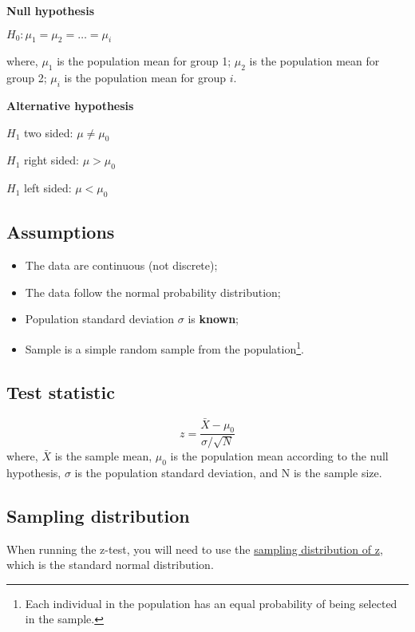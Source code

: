 \documentclass[
]{article}
\providecommand{\tightlist}{%
  \setlength{\itemsep}{0pt}\setlength{\parskip}{0pt}}
\begin{document}
\textbf{Null hypothesis}

\(H_0:\mu_1 = \mu_2 = \ldots = \mu_i\)

where, \(\mu_1\) is the population mean for group 1; \(\mu_2\) is the population mean for group 2; \(\mu_i\) is the population mean for group \(i\).

\textbf{Alternative hypothesis}

\(H_1\) two sided: \(\mu \ne \mu_0\)

\(H_1\) right sided: \(\mu > \mu_0\)

\(H_1\) left sided: \(\mu < \mu_0\)

\hypertarget{assumptions}{%
\subsection{Assumptions}\label{assumptions}}

\begin{itemize}
\tightlist
\item
  The data are continuous (not discrete);
\item
  The data follow the normal probability distribution;
\item
  Population standard deviation \(\sigma\) is \textbf{known};
\item
  Sample is a simple random sample from the population\footnote{Each individual in the population has an equal probability of being selected in the sample.}.
\end{itemize}

\hypertarget{test-statistic}{%
\subsection{Test statistic}\label{test-statistic}}

\[
z = \dfrac{\bar{X} - \mu_0}{\sigma / \sqrt{N}}
\] where, \(\bar{X}\) is the sample mean, \(\mu_0\) is the population mean according to the null hypothesis, \(\sigma\) is the population standard deviation, and N is the sample size.

\hypertarget{sampling-distribution}{%
\subsection{Sampling distribution}\label{sampling-distribution}}

When running the z-test, you will need to use the \href{https://statkat.com/sampling-distribution/one-sample-z-test/z.php}{sampling distribution of z}, which is the standard normal distribution.
\end{document}
